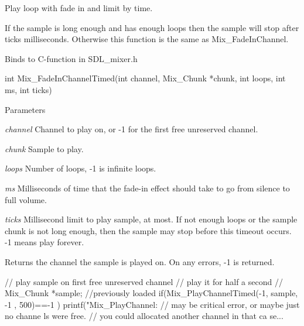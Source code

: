 Play loop with fade in and limit by time. 

If the sample is long enough and has enough loops then the sample will stop after ticks milliseconds. Otherwise this function is the same as Mix\_\-FadeInChannel. 

Binds to C-\/function in SDL\_\-mixer.h 
\begin{DoxyCode}
int Mix_FadeInChannelTimed(int channel, Mix_Chunk *chunk, int loops, int ms, int 
      ticks)
\end{DoxyCode}
 


\begin{DoxyParams}{Parameters}
\item[{\em channel}]Channel to play on, or -\/1 for the first free unreserved channel. \item[{\em chunk}]Sample to play. \item[{\em loops}]Number of loops, -\/1 is infinite loops. \item[{\em ms}]Milliseconds of time that the fade-\/in effect should take to go from silence to full volume. \item[{\em ticks}]Millisecond limit to play sample, at most. If not enough loops or the sample chunk is not long enough, then the sample may stop before this timeout occurs. -\/1 means play forever.\end{DoxyParams}
\begin{DoxyReturn}{Returns}
the channel the sample is played on. On any errors, -\/1 is returned. 
\end{DoxyReturn}

\begin{DoxyCode}
                    // play sample on first free unreserved channel
                                // play it for half a second
                                // Mix_Chunk *sample; //previously loaded
                                if(Mix_PlayChannelTimed(-1, sample, -1 , 500)==-1
      ) 
                        {
                                printf("Mix_PlayChannel: %
                                // may be critical error, or maybe just no channe
      ls were free.
                                // you could allocated another channel in that ca
      se...
                        }
\end{DoxyCode}
 

